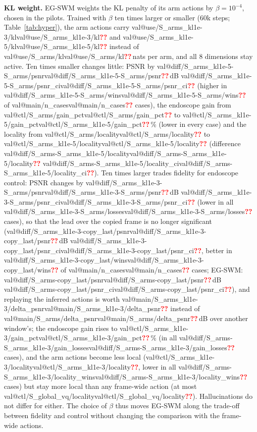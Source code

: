 \documentclass[journal]{IEEEtran}
\makeatletter
\newcommand{\method}{EG-SWM}
\newcommand{\val}[1]{\ifcsname val@#1\endcsname\csname val@#1\endcsname\else\textcolor{red}{\textbf{??}}\fi}
\makeatother
\begin{document}
\textbf{KL weight.} \method{} weights the KL penalty of its arm actions by $\beta=10^{-4}$, chosen in the pilots. Trained with $\beta$ ten times larger or smaller (60k steps; Table~\ref{tab:hyper}), the arm actions carry \val{use/S_arms_kl1e-3/kl} and \val{use/S_arms_kl1e-5/kl} instead of \val{use/S_arms/kl}\,nats per arm, and all 8 dimensions stay active. Ten times smaller changes little: PSNR by \val{diff/S_arms_kl1e-5-S_arms/psnr}\,dB \val{diff/S_arms_kl1e-5-S_arms/psnr_ci} (higher in \val{diff/S_arms_kl1e-5-S_arms/wins} of \val{main/n_cases} cases), the endoscope gain from \val{ctl/S_arms/gain_pct} to \val{ctl/S_arms_kl1e-5/gain_pct}\,\% (lower in every case) and the locality from \val{ctl/S_arms/locality} to \val{ctl/S_arms_kl1e-5/locality} (difference \val{diff/S_arms-S_arms_kl1e-5/locality} \val{diff/S_arms-S_arms_kl1e-5/locality_ci}). Ten times larger trades fidelity for endoscope control: PSNR changes by \val{diff/S_arms_kl1e-3-S_arms/psnr}\,dB \val{diff/S_arms_kl1e-3-S_arms/psnr_ci} (lower in all \val{diff/S_arms_kl1e-3-S_arms/losses} cases), so that the lead over the copied frame is no longer significant (\val{diff/S_arms_kl1e-3-copy_last/psnr}\,dB \val{diff/S_arms_kl1e-3-copy_last/psnr_ci}, better in \val{diff/S_arms_kl1e-3-copy_last/wins} of \val{main/n_cases} cases; \method{}: \val{diff/S_arms-copy_last/psnr}\,dB \val{diff/S_arms-copy_last/psnr_ci}), and replaying the inferred actions is worth \val{main/S_arms_kl1e-3/delta_psnr} instead of \val{main/S_arms/delta_psnr}\,dB over another window's; the endoscope gain rises to \val{ctl/S_arms_kl1e-3/gain_pct}\,\% (in all \val{diff/S_arms-S_arms_kl1e-3/gain_losses} cases), and the arm actions become less local (\val{ctl/S_arms_kl1e-3/locality}, lower in all \val{diff/S_arms-S_arms_kl1e-3/locality_wins} cases) but stay more local than any frame-wide action (at most \val{ctl/S_global_vq/locality}). Hallucinations do not differ for either. The choice of $\beta$ thus moves \method{} along the trade-off between fidelity and control without changing the comparison with the frame-wide actions.
\end{document}
